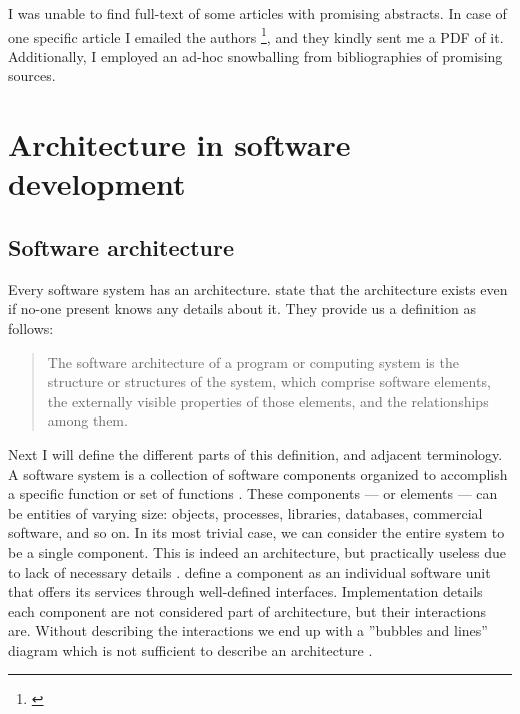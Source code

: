 \documentclass[utf8,english]{gradu3}
\begin{document}
I was unable to find full-text of some articles with promising abstracts.
In case of one specific article I emailed the authors
\footnote{\textcite{Bogner2018}}, and they kindly sent me a PDF of it.
Additionally, I employed an ad-hoc snowballing from bibliographies of promising
sources.

\section{Architecture in software development}

\subsection{Software architecture}

Every software system has an architecture. \textcite[23]{Bass1998} state that
the architecture exists even if no-one present knows any details about it. They
provide us a definition as follows:

\begin{quote}
  The software architecture of a program or computing system is the structure or
  structures of the system, which comprise software elements, the externally
  visible properties of those elements, and the relationships among them.
\end{quote}

Next I will define the different parts of this definition, and adjacent terminology. A software
  system is a collection of software components organized to
accomplish a specific function or set of functions \parencite[3]{IEEE42010}.
These components --- or elements --- can be entities of varying size: objects,
processes, libraries, databases, commercial software, and so on. In its most
trivial case, we can consider the entire system to be a single component. This
is indeed an architecture, but practically useless due to lack of necessary
details \parencite[24]{Bass1998}. \textcite[53]{Koskimies2005} define a component as an individual
software unit that offers its services through well-defined interfaces.
Implementation details each component are not considered part of
architecture, but their interactions are. Without describing the interactions we
end up with a ''bubbles and lines'' diagram which is not sufficient to describe
an architecture \parencite[24]{Bass1998}.
\end{document}
